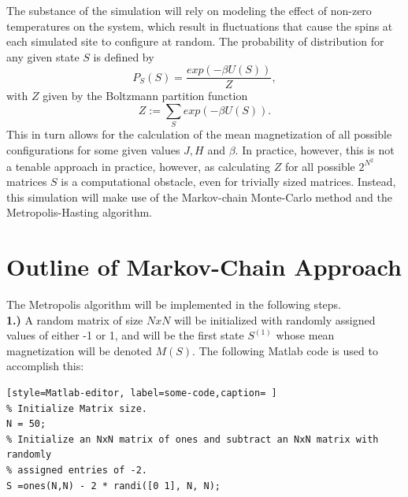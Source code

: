 \documentclass{article}
\begin{document}
\noindent The substance of the simulation will rely on modeling the effect of non-zero temperatures on the system, which result in fluctuations that cause the spins at each simulated site to configure at random. The probability of distribution for any given state $S$ is defined by 
\begin{equation}
P_S(S) = \frac{exp(-\beta U(S))}{Z},
\end{equation}
with $Z$ given by the Boltzmann partition function
\begin{equation}
Z := \sum_{{S}} exp(-\beta U(S)).
\end{equation} 
This in turn allows for the calculation of the mean magnetization of all possible configurations for some given values $J, H$ and $\beta.$ In practice, however, this is not a tenable approach in practice, however, as calculating $Z$ for all possible $2^{N^2}$ matrices $S$ is a computational obstacle, even for trivially sized matrices. Instead, this simulation will make use of the Markov-chain Monte-Carlo method and the Metropolis-Hasting algorithm.

\section{Outline of Markov-Chain Approach}

The Metropolis algorithm will be implemented in the following steps. \\

\noindent
\textbf{1.)} A random matrix of size $NxN$ will be initialized with randomly assigned values of either -1 or 1, and will be the first state $S^{(1)}$ whose mean magnetization will be denoted $M(S).$ The following Matlab code is used to accomplish this:


\begin{lstlisting}[style=Matlab-editor, label=some-code,caption= ]
% Initialize Matrix size.
N = 50;
% Initialize an NxN matrix of ones and subtract an NxN matrix with randomly
% assigned entries of -2.
S =ones(N,N) - 2 * randi([0 1], N, N); 
\end{lstlisting}
\end{document}
